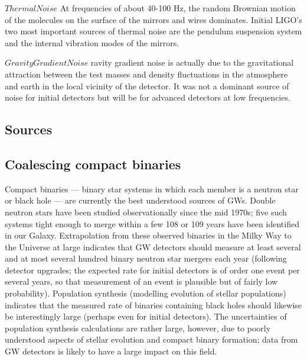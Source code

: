 \documentclass[binding=0.6cm, LaM]{sapthesis}
\begin{document}
$Thermal Noise$
At frequencies of about 40-100 Hz, the random Brownian motion of the molecules on the surface of the mirrors and wires dominates. Initial LIGO’s two most important sources of thermal noise are the pendulum suspension system and the internal vibration modes of the mirrors.

$Gravity Gradient Noise$
ravity gradient noise is actually due to the gravitational attraction between the test masses and density fluctuations in the atmosphere and earth in the local vicinity of the detector. It was not a dominant source of noise for initial detectors but will be for advanced detectors at low frequencies.


\subsection{Sources}

\subsection{Coalescing compact binaries}
Compact binaries — binary star systems in which each member is a neutron star or black hole — are currently the best understood sources of GWs.
 Double neutron stars have been studied observationally since the mid 1970s; five such systems tight enough to merge within a few 108 or 109 years have been identified in our Galaxy.
Extrapolation from these observed binaries in the Milky Way to the Universe at large indicates that GW detectors should measure at least several and at most several hundred binary neutron star mergers
 each year (following detector upgrades; the expected rate for initial detectors is of order one event per several years, so that measurement of an event is plausible but of fairly low probability).
Population synthesis (modelling evolution of stellar populations) indicates that the measured rate of binaries containing black holes should likewise be interestingly large (perhaps even for initial
 detectors). The uncertainties of population synthesis calculations are rather large, however, due to poorly understood aspects of stellar evolution and compact binary formation;
 data from GW detectors is likely to have a large impact on this field.
\end{document}
